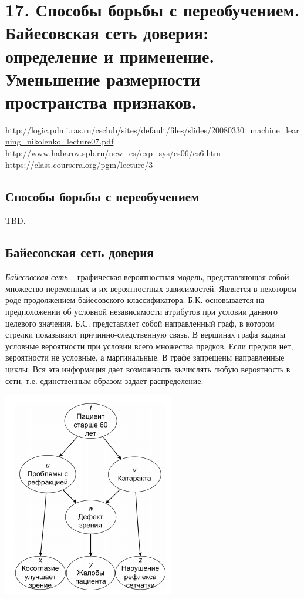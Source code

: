 \documentclass[a4paper,12pt]{article}
\begin{document}
\section*{17. Способы борьбы с переобучением. Байесовская сеть доверия: определение и применение. Уменьшение размерности пространства признаков.}
\url{http://logic.pdmi.ras.ru/csclub/sites/default/files/slides/20080330_machine_learning_nikolenko_lecture07.pdf}
\url{http://www.habarov.spb.ru/new_es/exp_sys/es06/es6.htm}
\url{https://class.coursera.org/pgm/lecture/3}

\subsection*{Способы борьбы с переобучением}

TBD.

\subsection*{Байесовская сеть доверия}
\textit{Байесовская сеть} -- графическая вероятностная модель, представляющая собой множество переменных и их вероятностных зависимостей. Является в некотором роде продолжением байесовского классификатора. Б.К. основывается на предположении об условной независимости атрибутов при условии данного целевого значения. Б.С. представляет собой направленный граф, в котором стрелки показывают причинно-следственную связь. В вершинах графа заданы условные вероятности при условии всего множества предков. Если предков нет, вероятности не условные, а маргинальные. В графе запрещены направленные циклы. Вся эта информация дает возможность вычислять любую вероятность в сети, т.е. единственным образом задает распределение.

\includegraphics{network}
\end{document}
